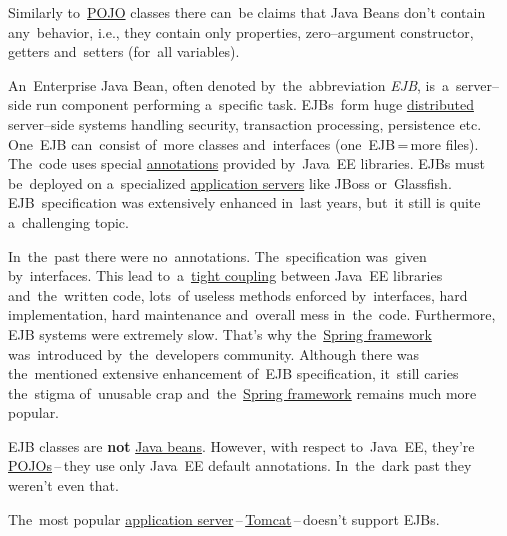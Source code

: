 \warning Similarly to~\hyperref[pojo]{POJO} classes there can~be claims that Java Beans don't contain any~behavior, i.e., they contain only properties, zero--argument constructor, getters and~setters (for~all variables).

\label{enterprisejavabeans}
An~Enterprise Java Bean, often denoted by~the~abbreviation \textit{EJB}, is~a~server--side run component performing a~specific task. EJBs~form huge \hyperref[distributedsystem]{distributed} server--side systems handling security, transaction processing, persistence etc. One~EJB can~consist of~more classes and~interfaces (one~EJB\,=\,more files). The~code uses special \hyperref[annotations]{annotations} provided by~Java~EE libraries. EJBs must be~deployed on a~specialized \hyperref[applicationserver]{application servers} like JBoss or~Glassfish. EJB~specification was extensively enhanced in~last years, but~it still is quite a~challenging topic.

In~the~past there were no~annotations. The~specification was~given by~interfaces. This lead to~a~\hyperref[loosetightcoupling]{tight coupling} between Java~EE libraries and~the~written code, lots~of useless methods enforced by~interfaces, hard implementation, hard maintenance and~overall mess in~the~code. Furthermore, EJB systems were extremely slow. That's why the~\hyperref[springframework]{Spring framework} was~introduced by~the~developers community. Although there was the~mentioned extensive enhancement of~EJB specification, it~still caries the~stigma of~unusable crap and~the~\hyperref[springframework]{Spring framework} remains much more popular.

\warning EJB classes are \textbf{not} \hyperref[javabeans]{Java beans}. However, with respect to~Java~EE, they're \hyperref[pojo]{POJOs}\,--\,they use only Java~EE default annotations. In~the~dark past they weren't even that.

\warning The~most popular \hyperref[applicationserver]{application server}\,--\,\hyperref[tomcat]{Tomcat}\,--\,doesn't support EJBs.



\label{classpath}

\label{classloaders}




